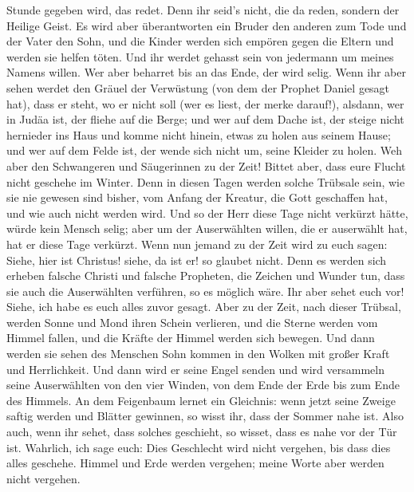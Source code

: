Stunde gegeben wird, das redet. Denn ihr seid's nicht, die da reden,
sondern der Heilige Geist.  Es wird aber überantworten ein
Bruder den anderen zum Tode und der Vater den Sohn, und die Kinder
werden sich empören gegen die Eltern und werden sie helfen töten.
 Und ihr werdet gehasst sein von jedermann um meines Namens
willen. Wer aber beharret bis an das Ende, der wird selig. 
Wenn ihr aber sehen werdet den Gräuel der Verwüstung (von dem der
Prophet Daniel gesagt hat), dass er steht, wo er nicht soll (wer es
liest, der merke darauf!), alsdann, wer in Judäa ist, der fliehe auf die
Berge;  und wer auf dem Dache ist, der steige nicht
hernieder ins Haus und komme nicht hinein, etwas zu holen aus seinem
Hause;  und wer auf dem Felde ist, der wende sich nicht um,
seine Kleider zu holen.  Weh aber den Schwangeren und
Säugerinnen zu der Zeit!  Bittet aber, dass eure Flucht
nicht geschehe im Winter.  Denn in diesen Tagen werden
solche Trübsale sein, wie sie nie gewesen sind bisher, vom Anfang der
Kreatur, die Gott geschaffen hat, und wie auch nicht werden wird.
 Und so der Herr diese Tage nicht verkürzt hätte, würde
kein Mensch selig; aber um der Auserwählten willen, die er auserwählt
hat, hat er diese Tage verkürzt.  Wenn nun jemand zu der
Zeit wird zu euch sagen: Siehe, hier ist Christus! siehe, da ist er! so
glaubet nicht.  Denn es werden sich erheben falsche Christi
und falsche Propheten, die Zeichen und Wunder tun, dass sie auch die
Auserwählten verführen, so es möglich wäre.  Ihr aber sehet
euch vor! Siehe, ich habe es euch alles zuvor gesagt.  Aber
zu der Zeit, nach dieser Trübsal, werden Sonne und Mond ihren Schein
verlieren,  und die Sterne werden vom Himmel fallen, und
die Kräfte der Himmel werden sich bewegen.  Und dann werden
sie sehen des Menschen Sohn kommen in den Wolken mit großer Kraft und
Herrlichkeit.  Und dann wird er seine Engel senden und wird
versammeln seine Auserwählten von den vier Winden, von dem Ende der Erde
bis zum Ende des Himmels.  An dem Feigenbaum lernet ein
Gleichnis: wenn jetzt seine Zweige saftig werden und Blätter gewinnen,
so wisst ihr, dass der Sommer nahe ist.  Also auch, wenn
ihr sehet, dass solches geschieht, so wisset, dass es nahe vor der Tür
ist.  Wahrlich, ich sage euch: Dies Geschlecht wird nicht
vergehen, bis dass dies alles geschehe.  Himmel und Erde
werden vergehen; meine Worte aber werden nicht vergehen. 
